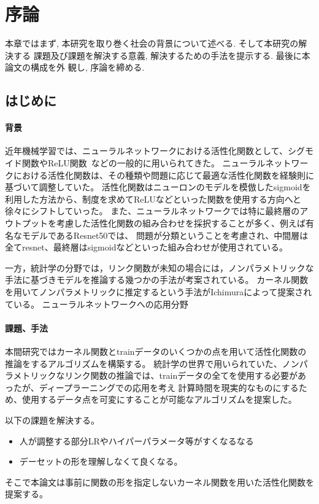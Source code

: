 \chapter{序論}
\label{introduction}

本章ではまず, 本研究を取り巻く社会の背景について述べる. そして本研究の解決する
課題及び課題を解決する意義, 解決するための手法を提示する. 最後に本論文の構成を外
観し, 序論を締める.

\section{はじめに}
\label{introduction:background}

\subsubsection{背景}
近年機械学習では、ニューラルネットワークにおける活性化関数として、シグモイド関数やReLU関数~\cite{ReLU}などの一般的に用いられてきた。
ニューラルネットワークにおける活性化関数は、その種類や問題に応じて最適な活性化関数を経験則に基づいて調整していた。
活性化関数はニューロンのモデルを模倣したsigmoidを利用した方法から、制度を求めてReLUなどといった関数を使用する方向へと徐々にシフトしていった。
また、ニューラルネットワークでは特に最終層のアウトプットを考慮した活性化関数の組み合わせを採択することが多く、例えば有名なモデルであるResnet50では、
問題が分類ということを考慮され、中間層は全てresnet、最終層はsigmoidなどといった組み合わせが使用されている。


一方，統計学の分野では，リンク関数が未知の場合には，ノンパラメトリックな手法に基づきモデルを推論する幾つかの手法が考案されている。
カーネル関数を用いてノンパラメトリックに推定するという手法がIchimuraによって提案されている。
ニューラルネットワークへの応用分野

\subsubsection{課題、手法}

本間研究ではカーネル関数とtrainデータのいくつかの点を用いて活性化関数の推論をするアルゴリズムを構築する。
統計学の世界で用いられていた、ノンパラメトリックなリンク関数の推論では、trainデータの全てを使用する必要があったが、ディープラーニングでの応用を考え
計算時間を現実的なものにするため、使用するデータ点を可変にすることが可能なアルゴリズムを提案した。

以下の課題を解決する。
\begin{itemize}
  \item 人が調整する部分LRやハイパーパラメータ等がすくなるなる
  \item デーセットの形を理解しなくて良くなる。
\end{itemize}
そこで本論文は事前に関数の形を指定しないカーネル関数を用いた活性化関数を提案する。

